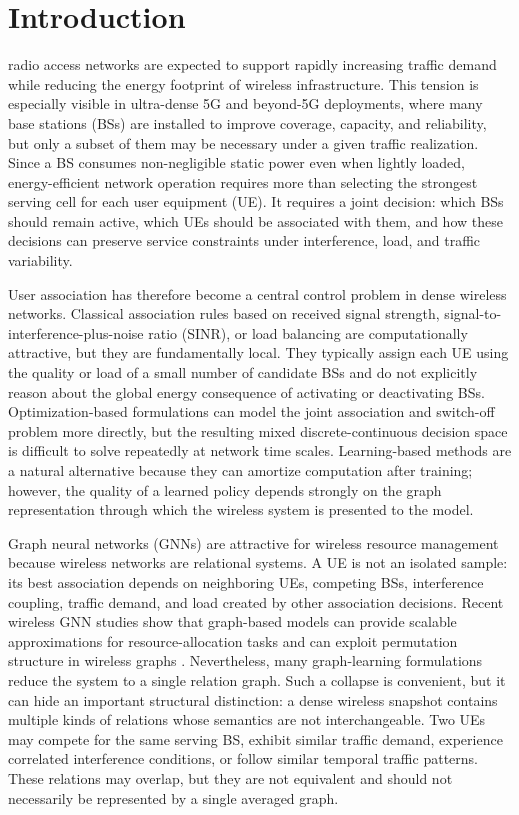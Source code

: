 \documentclass[journal]{IEEEtran}
\begin{document}
\section{Introduction}
 radio access networks are expected to support rapidly
increasing traffic demand while reducing the energy footprint of wireless
infrastructure. This tension is especially visible in ultra-dense 5G and
beyond-5G deployments, where many base stations (BSs) are installed to improve
coverage, capacity, and reliability, but only a subset of them may be necessary
under a given traffic realization. Since a BS consumes non-negligible static
power even when lightly loaded, energy-efficient network operation requires
more than selecting the strongest serving cell for each user equipment (UE). It
requires a joint decision: which BSs should remain active, which UEs should be
associated with them, and how these decisions can preserve service constraints
under interference, load, and traffic variability.

User association has therefore become a central control problem in dense
wireless networks. Classical association rules based on received signal
strength, signal-to-interference-plus-noise ratio (SINR), or load balancing are
computationally attractive, but they are fundamentally local. They typically
assign each UE using the quality or load of a small number of candidate BSs and
do not explicitly reason about the global energy consequence of activating or
deactivating BSs. Optimization-based formulations can model the joint
association and switch-off problem more directly, but the resulting mixed
discrete-continuous decision space is difficult to solve repeatedly at network
time scales. Learning-based methods are a natural alternative because they can
amortize computation after training; however, the quality of a learned policy
depends strongly on the graph representation through which the wireless system
is presented to the model.

Graph neural networks (GNNs) are attractive for wireless resource management
because wireless networks are relational systems. A UE is not an isolated
sample: its best association depends on neighboring UEs, competing BSs,
interference coupling, traffic demand, and load created by other association
decisions. Recent wireless GNN studies show that graph-based models can provide
scalable approximations for resource-allocation tasks and can exploit
permutation structure in wireless graphs \cite{eisen2020optimal,shen2021scalable}.
Nevertheless, many graph-learning formulations reduce the system to a single
relation graph. Such a collapse is convenient, but it can hide an important
structural distinction: a dense wireless snapshot contains multiple kinds of
relations whose semantics are not interchangeable. Two UEs may compete for the
same serving BS, exhibit similar traffic demand, experience correlated
interference conditions, or follow similar temporal traffic patterns. These
relations may overlap, but they are not equivalent and should not necessarily
be represented by a single averaged graph.
\end{document}

